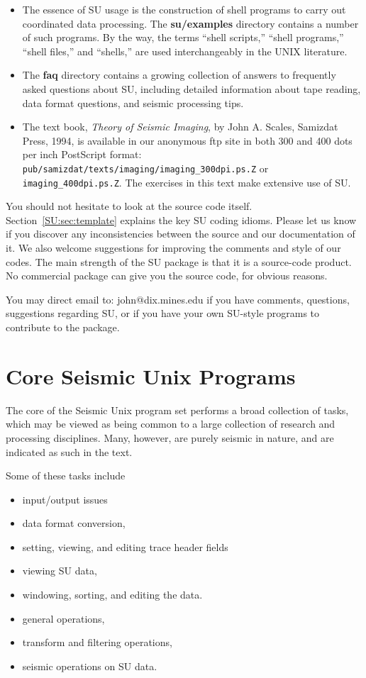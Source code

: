 {{{\begin{itemize}
\item The essence of {\small\sf SU} usage is the construction of shell programs
  to carry out coordinated data processing.  The {\bf su/examples\/}
  directory contains a number of such programs.  By the way, the terms
  ``shell scripts,'' ``shell programs,'' ``shell files,'' and
  ``shells,'' are used interchangeably in the UNIX literature.

\item The {\bf faq\/} directory contains a growing collection of answers
  to frequently asked questions about {\small\sf SU}, including detailed information
  about tape reading, data format questions, and seismic processing tips.

\item The text book, {\em Theory of Seismic Imaging}, by John A.
  Scales, Samizdat Press, 1994, is available in our anonymous ftp site
  in both 300 and 400 dots per inch PostScript format:
  \verb:pub/samizdat/texts/imaging/imaging_300dpi.ps.Z: or
  \verb:imaging_400dpi.ps.Z:.  The exercises in this text make
  extensive use of {\small\sf SU}.
\end{itemize}

You should not hesitate to look at the source code itself.
Section~\ref{SU:sec:template} explains the key {\small\sf SU} coding idioms.
Please let us know if you discover any inconsistencies between the
source and our documentation of it.  We also welcome suggestions for
improving the comments and style of our codes.  The main
strength of the SU package is that it is a source-code product.
No commercial package can give you the source code, for obvious
reasons.

You may direct email to:  john@dix.mines.edu 
if you have comments, questions, suggestions regarding {\small\sf SU},
or if you have your own {\small\sf SU}-style programs to contribute
to the package.


\chapter{Core Seismic Unix Programs} 

The core of the Seismic Unix program set performs a broad
collection of tasks, which may be viewed as being common
to a large collection of research and processing disciplines.
Many, however, are purely seismic in nature, and are indicated
as such in the text.

Some of these tasks include
\begin{itemize}
\item input/output issues
\item data format conversion,
\item setting, viewing, and editing trace header fields
\item viewing SU data,
\item windowing, sorting, and editing the data.
\item general operations,
\item transform and filtering operations,
\item seismic operations on SU data.
\end{itemize}

}}}
